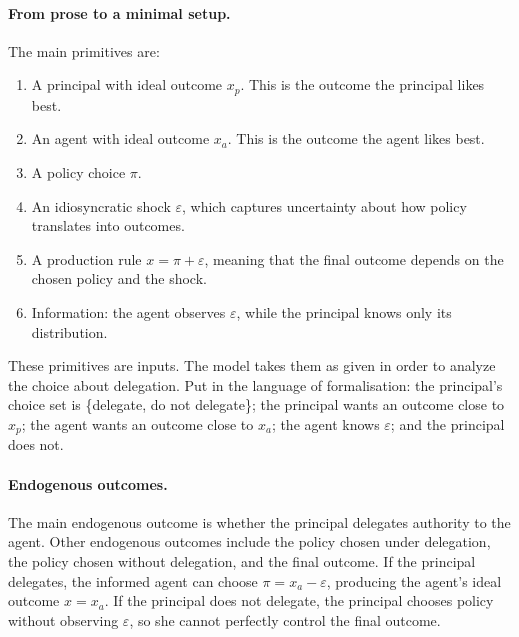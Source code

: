 \documentclass[12pt]{article}
\begin{document}
\paragraph{From prose to a minimal setup.}
The main primitives are:
\begin{enumerate}
\item A principal with ideal outcome $x_p$. This is the outcome the principal likes best.
\item An agent with ideal outcome $x_a$. This is the outcome the agent likes best.
\item A policy choice $\pi$.
\item An idiosyncratic shock $\varepsilon$, which captures uncertainty about how policy translates into outcomes.
\item A production rule $x=\pi+\varepsilon$, meaning that the final outcome depends on the chosen policy and the shock.
\item Information: the agent observes $\varepsilon$, while the principal knows only its distribution.
\end{enumerate}

These primitives are inputs. The model takes them as given in order to analyze the choice about delegation. Put in the language of formalisation: the principal's choice set is \{delegate, do not delegate\}; the principal wants an outcome close to $x_p$; the agent wants an outcome close to $x_a$; the agent knows $\varepsilon$; and the principal does not.

\paragraph{Endogenous outcomes.}
The main endogenous outcome is whether the principal delegates authority to the agent. Other endogenous outcomes include the policy chosen under delegation, the policy chosen without delegation, and the final outcome. If the principal delegates, the informed agent can choose $\pi=x_a-\varepsilon$, producing the agent's ideal outcome $x=x_a$. If the principal does not delegate, the principal chooses policy without observing $\varepsilon$, so she cannot perfectly control the final outcome.
\end{document}
